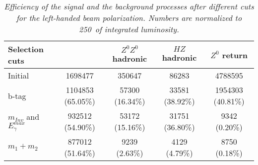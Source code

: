 \begin{table}[H]
        \begin{center}
        \begin{tabular}{l c c c c}
        \hline
	Selection cuts 					& \bbbar 			& $Z^0Z^0$ hadronic & $HZ$ hadronic 	&  $Z^0$ return   \\
	\hline
	Initial 							& 1698477 			& 350647 			& 86283 			& 4788595 \\
	b-tag  							& 1104853 (65.05\%) & 57300 (16.34\%) 	& 33581 (38.92\%) 	& 1954303 (40.81\%) \\
	$m_{Inv}$ and $E_\gamma^{max}$  	& 932512 (54.90\%) 	& 53172 (15.16\%) 	& 31751 (36.80\%) 	& 9342 (0.20\%) \\
	$m_1+m_2$  						& 877012 (51.64\%) 	& 9239 (2.63\%) 	& 4129 (4.79\%) 	& 8750 (0.18\%) \\
        \hline
        \end{tabular}
        \end{center}
        \caption{\sl Efficiency of the signal and the background processes after different cuts for the left-handed beam polarization. Numbers are normalized to 250\ifb\ of integrated luminosity.}
        \label{table:bbbarselection} %
\end{table}
